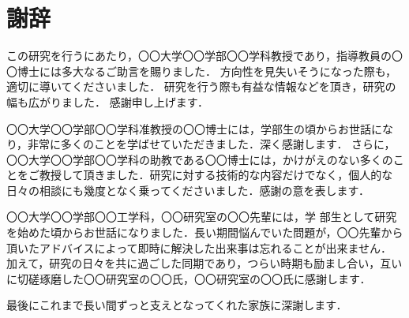 \section*{謝辞}

この研究を行うにあたり，〇〇大学〇〇学部〇〇学科教授であり，指導教員の〇〇博士には多大なるご助言を賜りました．
方向性を見失いそうになった際も，適切に導いてくださいました．
研究を行う際も有益な情報などを頂き，研究の幅も広がりました．
感謝申し上げます．


〇〇大学〇〇学部〇〇学科准教授の〇〇博士には，学部生の頃からお世話になり，非常に多くのことを学ばせていただきました．深く感謝します．
さらに，〇〇大学〇〇学部〇〇学科の助教である〇〇博士には，かけがえのない多くのことをご教授して頂きました．研究に対する技術的な内容だけでなく，個人的な日々の相談にも幾度となく乗ってくださいました．感謝の意を表します．


〇〇大学〇〇学部〇〇工学科，〇〇研究室の〇〇先輩には，学
部生として研究を始めた頃からお世話になりました．長い期間悩んでいた問題が，〇〇先輩から頂いたアドバイスによって即時に解決した出来事は忘れることが出来ません．
加えて，研究の日々を共に過ごした同期であり，つらい時期も励まし合い，互いに切磋琢磨した〇〇研究室の〇〇氏，〇〇研究室の〇〇氏に感謝します．


最後にこれまで長い間ずっと支えとなってくれた家族に深謝します．



